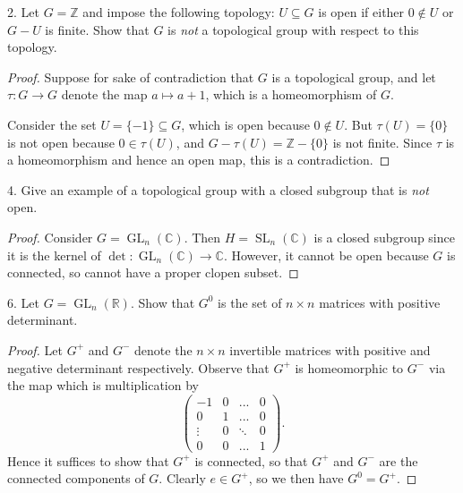 \documentclass[11pt,oneside]{article}
\def\R{{\mathbb R}}
\def\Z{{\mathbb Z}}
\def\C{{\mathbb C}}
\def\GL{\operatorname{GL}}
\def\SL{\operatorname{SL}}
\begin{document}
2. Let $G = \Z$ and impose the following topology: $U \subseteq G$ is open if either $0 \notin U$ or $G - U$ is finite. Show that $G$ is \textit{not} a topological group with respect to this topology.

\begin{proof}
Suppose for sake of contradiction that $G$ is a topological group, and let $\tau : G \to G$ denote the map $a \mapsto a+1$, which is a homeomorphism of $G$. 

Consider the set $U = \{-1\} \subseteq G$, which is open because $0 \notin U$. But $\tau(U) = \{0\}$ is not open because $0 \in \tau(U)$, and $G - \tau(U) = \Z -\{0\}$ is not finite. Since $\tau$ is a homeomorphism and hence an open map, this is a contradiction.
\end{proof}

4. Give an example of a topological group with a closed subgroup that is \textit{not} open.

\begin{proof}
Consider $G = \GL_n(\C)$. Then $H = \SL_n(\C)$ is a closed subgroup since it is the kernel of $\det : \GL_n(\C) \to \C$. However, it cannot be open because $G$ is connected, so cannot have a proper clopen subset.

\end{proof}

6. Let $G = \GL_n(\R)$. Show that $G^0$ is the set of $n \times n$ matrices with positive determinant.

\begin{proof}
Let $G^+$ and $G^-$ denote the $n \times n$ invertible matrices with positive and negative determinant respectively. Observe that $G^+$ is homeomorphic to $G^-$ via the map which is multiplication by
\[ \left( \begin{matrix} 
-1 & 0 & ... & 0 \\
0 & 1 & ... & 0 \\
\vdots & 0 & \ddots & 0 \\
0 & 0 & ... & 1
\end{matrix} \right). \]
Hence it suffices to show that $G^+$ is connected, so that $G^+$ and $G^-$ are the connected components of $G$. Clearly $e \in G^+$, so we then have $G^0 = G^+$.
\end{proof}
\end{document}
